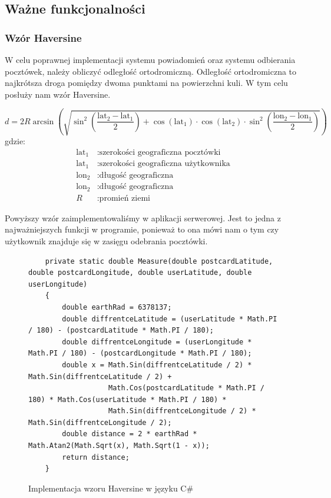 \documentclass[a4paper,twoside,12pt]{book}
\begin{document}
\subsection{Ważne funkcjonalności}
\subsubsection{Wzór Haversine}
W celu poprawnej implementacji systemu powiadomień oraz systemu odbierania pocztówek, należy obliczyć odległość ortodromiczną. Odległość ortodromiczna to najkrótsza droga pomiędzy dwoma punktami na powierzchni kuli. W tym celu posłuży nam wzór Haversine.

    \begin{equation}
    d = 2R \arcsin\left( \sqrt{\sin^2\left(\frac{{\text{{lat}}_2 - \text{{lat}}_1}}{2}\right) + \cos(\text{{lat}}_1) \cdot \cos(\text{{lat}}_2) \cdot \sin^2\left(\frac{{\text{{lon}}_2 - \text{{lon}}_1}}{2}\right)} \right)
    \end{equation}
    gdzie:
    \begin{align*}
    \text{{lat}}_1 & : \text{{szerokości geograficzna pocztówki}} \\
    \text{{lat}}_1 & : \text{{szerokości geograficzna użytkownika}} \\
    \text{{lon}}_2 & : \text{{długość geograficzna}} \\
    \text{{lon}}_2 & : \text{{długość geograficzna}} \\
    R & : \text{{promień ziemi}}
    \end{align*}

Powyższy wzór zaimplementowaliśmy w aplikacji serwerowej. Jest to jedna z najważniejszych funkcji w programie, ponieważ to ona mówi nam o tym czy użytkownik znajduje się w zasięgu odebrania pocztówki.


    \begin{figure}[H]
        \begin{lstlisting}
    private static double Measure(double postcardLatitude, double postcardLongitude, double userLatitude, double userLongitude)
    {
        double earthRad = 6378137;
        double diffrentceLatitude = (userLatitude * Math.PI / 180) - (postcardLatitude * Math.PI / 180);
        double diffrentceLongitude = (userLongitude * Math.PI / 180) - (postcardLongitude * Math.PI / 180);
        double x = Math.Sin(diffrentceLatitude / 2) * Math.Sin(diffrentceLatitude / 2) +
                   Math.Cos(postcardLatitude * Math.PI / 180) * Math.Cos(userLatitude * Math.PI / 180) *
                   Math.Sin(diffrentceLongitude / 2) * Math.Sin(diffrentceLongitude / 2);
        double distance = 2 * earthRad * Math.Atan2(Math.Sqrt(x), Math.Sqrt(1 - x));
        return distance;
    }
        \end{lstlisting}
    \caption{Implementacja wzoru Haversine w języku C\#}
    \label{fig:pseudokod:listings}
    \end{figure}
\end{document}
